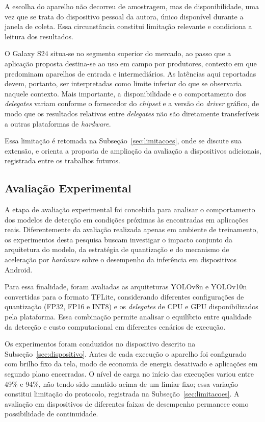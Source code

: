 \documentclass[artigo,times,capa]{iftex2024}
\begin{document}
A escolha do aparelho não decorreu de amostragem, mas de
disponibilidade, uma vez que se trata do dispositivo pessoal da
autora, único disponível durante a janela de coleta. Essa circunstância constitui
limitação relevante e condiciona a leitura dos resultados.
 
O Galaxy S24 situa-se no segmento superior do mercado, ao passo que a
aplicação proposta destina-se ao uso em campo por produtores, contexto em
que predominam aparelhos de entrada e intermediários. As latências aqui
reportadas devem, portanto, ser interpretadas como limite inferior do que
se observaria naquele contexto. Mais importante, a disponibilidade e o
comportamento dos \textit{delegates} variam conforme o fornecedor do
\textit{chipset} e a versão do \textit{driver} gráfico, de modo que os resultados
relativos entre \textit{delegates} não são diretamente transferíveis a outras
plataformas de \textit{hardware}.
 
Essa limitação é retomada na Subseção~\ref{sec:limitacoes}, onde se discute
sua extensão, e orienta a proposta de ampliação da avaliação a
dispositivos adicionais, registrada entre os trabalhos futuros.

\subsection{Avaliação Experimental}
\label{sec:avaliacao_experimental}

A etapa de avaliação experimental foi concebida para analisar o comportamento dos modelos de detecção em condições próximas às encontradas em aplicações reais. Diferentemente da avaliação realizada apenas em ambiente de treinamento, os experimentos desta pesquisa buscam investigar o impacto conjunto da arquitetura do modelo, da estratégia de quantização e do mecanismo de aceleração por \textit{hardware} sobre o desempenho da inferência em dispositivos Android.

Para essa finalidade, foram avaliadas as arquiteturas YOLOv8n e YOLOv10n convertidas para o formato \ac{TFLite}, considerando diferentes configurações de quantização (\ac{FP32}, \ac{FP16} e \ac{INT8}) e os \textit{delegates} de \ac{CPU} e \ac{GPU} disponibilizados pela plataforma. Essa combinação permite analisar o equilíbrio entre qualidade da detecção e custo computacional em diferentes cenários de execução.

Os experimentos foram conduzidos no dispositivo descrito na Subseção~\ref{sec:dispositivo}. Antes de cada execução o aparelho foi configurado com brilho fixo da tela, modo de economia de energia desativado e aplicações em segundo plano encerradas. O nível de carga no início das execuções variou entre 49\% e 94\%, não tendo sido mantido acima de um limiar fixo; essa variação constitui limitação do protocolo, registrada na Subseção~\ref{sec:limitacoes}. A avaliação em dispositivos de diferentes faixas de desempenho permanece como possibilidade de continuidade.
\end{document}
